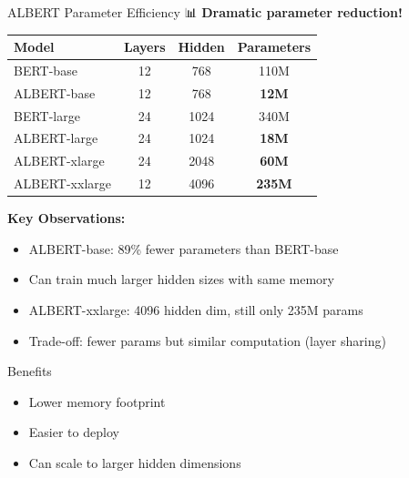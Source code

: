 \documentclass[aspectratio=169]{beamer}
\begin{document}
\begin{frame}[shrink=10]{ALBERT Parameter Efficiency 📊}
\small
\textbf{Dramatic parameter reduction!}

\vspace{1em}

\begin{center}
\begin{tabular}{lccc}
\toprule
\textbf{Model} & \textbf{Layers} & \textbf{Hidden} & \textbf{Parameters} \\
\midrule
BERT-base & 12 & 768 & 110M \\
ALBERT-base & 12 & 768 & \textbf{12M} \\
\midrule
BERT-large & 24 & 1024 & 340M \\
ALBERT-large & 24 & 1024 & \textbf{18M} \\
ALBERT-xlarge & 24 & 2048 & \textbf{60M} \\
ALBERT-xxlarge & 12 & 4096 & \textbf{235M} \\
\bottomrule
\end{tabular}
\end{center}

\vspace{1em}

\textbf{Key Observations:}
\begin{itemize}\setlength{\itemsep}{0pt}
    \item ALBERT-base: \alert{89\% fewer parameters} than BERT-base
    \item Can train much larger hidden sizes with same memory
    \item ALBERT-xxlarge: 4096 hidden dim, still only 235M params
    \item Trade-off: fewer params but similar computation (layer sharing)
\end{itemize}

\vspace{0.5em}

\begin{block}{Benefits}
\begin{itemize}\setlength{\itemsep}{0pt}
    \item Lower memory footprint
    \item Easier to deploy
    \item Can scale to larger hidden dimensions
\end{itemize}
\end{block}
\end{frame}
\end{document}
